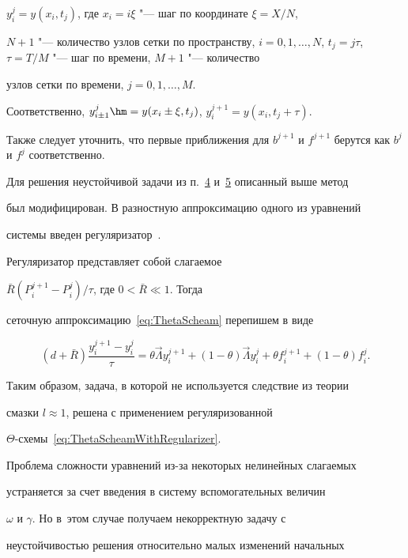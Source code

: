 $y_i^j=y(x_i,t_j)$, где ${x_i=i \xi}$ "--- шаг по координате $\xi=X/N$,

$N+1$ "--- количество узлов сетки по пространству, $i=0, 1, \dots,

N$, $t_j=j\tau$, $\tau=T/M$ "--- шаг по времени, $M+1$ "--- количество

узлов сетки по времени, $j=0, 1, \dots, M$. 

Соответственно, $y_{i\pm 1}^j \hm =y(x_i \pm \xi,t_j)$, $y_i^{j+1}=y(x_i,t_j+\tau)$. 

Также следует уточнить, что первые приближения для $b^{j+1}$ и $f^{j+1}$ берутся как $b^j$ и $f^j$ соответственно.



Для решения неустойчивой задачи из п.~\hyperlink{kol:4}{4} и~\hyperlink{kol:5}{5} описанный выше метод

был модифицирован. В разностную аппроксимацию одного из уравнений

системы введен регуляризатор~\cite{SamarskiVabishevich1990}.

Регуляризатор представляет собой слагаемое

$\bar{R}(P_i^{j+1}-P_i^j)/\tau$, где $0< \bar{R}\ll 1$. Тогда

сеточную аппроксимацию~\eqref{eq:ThetaScheam} перепишем в виде

\begin{equation}\label{eq:ThetaScheamWithRegularizer}

(d+\bar{R})\frac{y_i^{j+1}-y_i^j}{\tau}=\theta \Vec \Lambda

y_i^{j+1}+(1-\theta)\Vec \Lambda y_i^j+\theta

f_i^{j+1}+(1-\theta)f_i^j.

\end{equation}

Таким образом, задача, в которой не используется следствие из теории

смазки $l\approx 1$, решена с применением регуляризованной

$\Theta$-схемы~\eqref{eq:ThetaScheamWithRegularizer}.



Проблема сложности уравнений из-за некоторых нелинейных слагаемых

устраняется за счет введения в систему вспомогательных величин

$\omega$ и $\gamma$. Но в~этом случае получаем некорректную задачу с

неустойчивостью решения относительно малых изменений начальных

